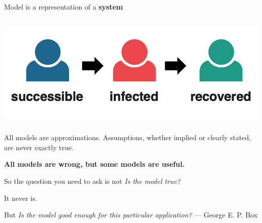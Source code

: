 \begin{frame}[t]{Model is a representation of a \textbf{system}}
\begin{columns}
\begin{column}{0.35\textwidth}
{\includegraphics[scale = 0.12]{lesson_1/images/sir.png}
 }
 \end{column}
 \end{columns} 
\end{frame}

{
\begin{frame}
\begin{center}
\large
    \color{white} %
    All models are approximations. Assumptions, whether implied or clearly stated, are never exactly true.
    
    \vspace{1em}
    \textbf{All models are wrong, but some models are useful.} 

    
    \vspace{1em}
    So the question you need to ask is not \textit{Is the model true?} 
    
    \vspace{1em}   
    It never is.

    \vspace{1em}
    But \textit{Is the model good enough for this particular application?}
  \vfill %
\hfill --- George E. P. Box %
\end{center}


\end{frame}
}
